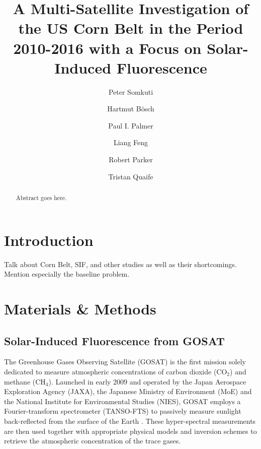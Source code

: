 \documentclass[preprint, a4paper, 10pt, times]{elsarticle}
\begin{document}
\begin{frontmatter}

\title{A Multi-Satellite Investigation of the US Corn Belt in the Period 2010-2016 with a Focus on Solar-Induced Fluorescence}

\author[uol,nceo]{Peter Somkuti}
\author[uol,nceo]{Hartmut B\"osch}
\author[uoe,nceo-uoe]{Paul I. Palmer}
\author[uoe,nceo-uoe]{Liang Feng}
\author[uol,nceo]{Robert Parker}
\author[read,nceo]{Tristan Quaife}

\address[uol]{Department of Physics of Astronomy, University of Leicester, Leicester, UK}
\address[uoe]{School of Geosciences, University of Edinburgh, Edinburgh, UK}
\address[read]{University of Reading, Reading, UK}
\address[nceo]{National Centre for Earth Observation, University of Leicester, Leicester, UK}
\address[nceo-uoe]{National Centre for Earth Observation, University of Edinburgh, Edinburgh, UK}

\begin{abstract}
Abstract goes here.
\end{abstract}

\end{frontmatter}
\linenumbers

\section{Introduction}

Talk about Corn Belt, SIF, and other studies as well as their shortcomings. Mention especially the baseline problem.

\section{Materials \& Methods}
\subsection{Solar-Induced Fluorescence from GOSAT}
\label{sec:GOSAT_SIF}

The Greenhouse Gases Observing Satellite (GOSAT) is the first mission solely dedicated to measure atmospheric concentrations of carbon dioxide (CO$_2$) and methane (CH$_4$). Launched in early 2009 and operated by the Japan Aerospace Exploration Agency (JAXA), the Japanese Ministry of Environment (MoE) and the National Institute for Environmental Studies (NIES), GOSAT employs a Fourier-transform spectrometer (TANSO-FTS) to passively measure sunlight back-reflected from the surface of the Earth \citep{yokota2009global}. These hyper-spectral measurements are then used together with appropriate physical models and inversion schemes to retrieve the atmospheric concentration of the trace gases.
\end{document}
